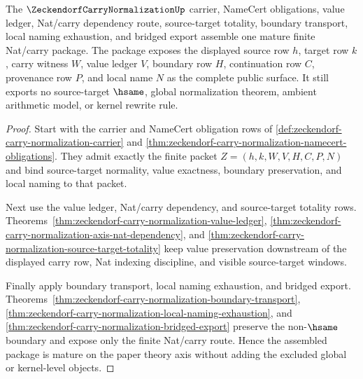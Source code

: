 \begin{theorem}
\label{thm:zeckendorf-carry-normalization-mature-package}
The $\ZeckendorfCarryNormalizationUp$ carrier, NameCert obligations, value ledger, Nat/carry dependency route, source-target totality, boundary transport, local naming exhaustion, and bridged export assemble one mature finite Nat/carry package. The package exposes the displayed source row $h$, target row $k$, carry witness $W$, value ledger $V$, boundary row $H$, continuation row $C$, provenance row $P$, and local name $N$ as the complete public surface. It still exports no source-target $\hsame$, global normalization theorem, ambient arithmetic model, or kernel rewrite rule.
\end{theorem}
\begin{proof}
Start with the carrier and NameCert obligation rows of \autoref{def:zeckendorf-carry-normalization-carrier} and \autoref{thm:zeckendorf-carry-normalization-namecert-obligations}. They admit exactly the finite packet $Z=(h,k,W,V,H,C,P,N)$ and bind source-target normality, value exactness, boundary preservation, and local naming to that packet.

Next use the value ledger, Nat/carry dependency, and source-target totality rows. Theorems~\ref{thm:zeckendorf-carry-normalization-value-ledger}, \ref{thm:zeckendorf-carry-normalization-axis-nat-dependency}, and \ref{thm:zeckendorf-carry-normalization-source-target-totality} keep value preservation downstream of the displayed carry row, Nat indexing discipline, and visible source-target windows.

Finally apply boundary transport, local naming exhaustion, and bridged export. Theorems~\ref{thm:zeckendorf-carry-normalization-boundary-transport}, \ref{thm:zeckendorf-carry-normalization-local-naming-exhaustion}, and \ref{thm:zeckendorf-carry-normalization-bridged-export} preserve the non-$\hsame$ boundary and expose only the finite Nat/carry route. Hence the assembled package is mature on the paper theory axis without adding the excluded global or kernel-level objects.
\end{proof}



